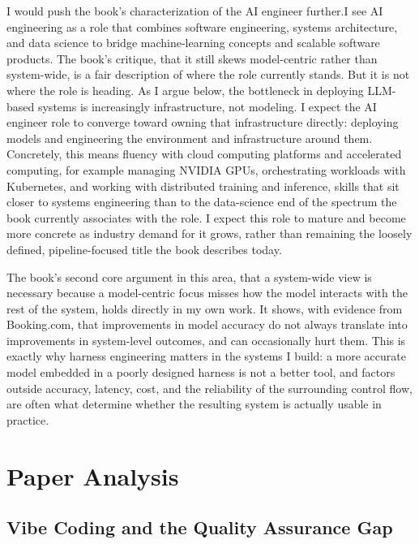\documentclass[11pt]{article}
\begin{document}
I would push the book's characterization of the AI engineer further.I see AI engineering as a role that combines software engineering, systems architecture, and data science to bridge machine-learning concepts and scalable software products. The book's critique, that it still skews model-centric rather than system-wide, is a fair description of where the role currently stands. But it is not where the role is heading. As I argue below, the bottleneck in deploying LLM-based systems is increasingly infrastructure, not modeling. I expect the AI engineer role to converge toward owning that infrastructure directly: deploying models and engineering the environment and infrastructure around them. Concretely, this means fluency with cloud computing platforms and accelerated computing, for example managing NVIDIA GPUs, orchestrating workloads with Kubernetes, and working with distributed training and inference, skills that sit closer to systems engineering than to the data-science end of the spectrum the book currently associates with the role. I expect this role to mature and become more concrete as industry demand for it grows, rather than remaining the loosely defined, pipeline-focused title the book describes today.

The book's second core argument in this area, that a system-wide view is necessary because a model-centric focus misses how the model interacts with the rest of the system, holds directly in my own work. It shows, with evidence from Booking.com, that improvements in model accuracy do not always translate into improvements in system-level outcomes, and can occasionally hurt them. This is exactly why harness engineering matters in the systems I build: a more accurate model embedded in a poorly designed harness is not a better tool, and factors outside accuracy, latency, cost, and the reliability of the surrounding control flow, are often what determine whether the resulting system is actually usable in practice.

\section{Paper Analysis}

\subsection{Vibe Coding and the Quality Assurance Gap}
\end{document}
